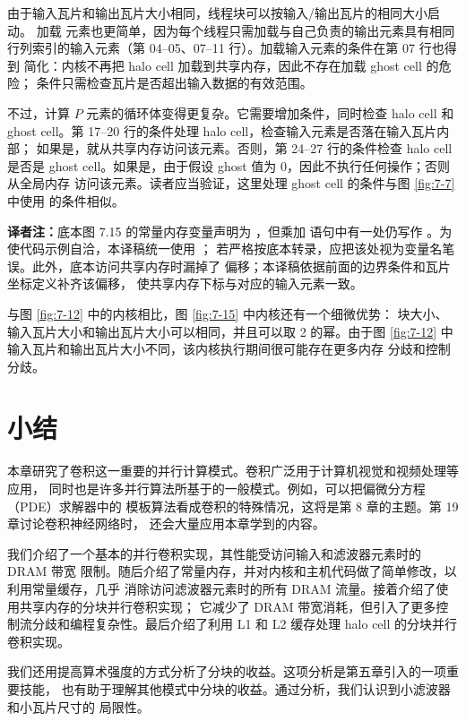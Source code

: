 由于输入瓦片和输出瓦片大小相同，线程块可以按输入/输出瓦片的相同大小启动。
加载  元素也更简单，因为每个线程只需加载与自己负责的输出元素具有相同
行列索引的输入元素（第 04–05、07–11 行）。加载输入元素的条件在第 07 行也得到
简化：内核不再把 halo cell 加载到共享内存，因此不存在加载 ghost cell 的危险；
条件只需检查瓦片是否超出输入数据的有效范围。

不过，计算 $P$ 元素的循环体变得更复杂。它需要增加条件，同时检查 halo cell 和
ghost cell。第 17–20 行的条件处理 halo cell，检查输入元素是否落在输入瓦片内部；
如果是，就从共享内存访问该元素。否则，第 24–27 行的条件检查 halo cell 是否是
ghost cell。如果是，由于假设 ghost 值为 0，因此不执行任何操作；否则从全局内存
访问该元素。读者应当验证，这里处理 ghost cell 的条件与图 \ref{fig:7-7} 中使用
的条件相似。

\noindent\textbf{译者注：}底本图 7.15 的常量内存变量声明为 ，但乘加
语句中有一处仍写作 。为使代码示例自洽，本译稿统一使用 ；
若严格按底本转录，应把该处视为变量名笔误。此外，底本访问共享内存时漏掉了
 偏移；本译稿依据前面的边界条件和瓦片坐标定义补齐该偏移，
使共享内存下标与对应的输入元素一致。

与图 \ref{fig:7-12} 中的内核相比，图 \ref{fig:7-15} 中内核还有一个细微优势：
块大小、输入瓦片大小和输出瓦片大小可以相同，并且可以取 2 的幂。由于图
\ref{fig:7-12} 中输入瓦片和输出瓦片大小不同，该内核执行期间很可能存在更多内存
分歧和控制分歧。

\section{小结}
\label{sec:convolution-summary}

本章研究了卷积这一重要的并行计算模式。卷积广泛用于计算机视觉和视频处理等应用，
同时也是许多并行算法所基于的一般模式。例如，可以把偏微分方程（PDE）求解器中的
模板算法看成卷积的特殊情况，这将是第 8 章的主题。第 19 章讨论卷积神经网络时，
还会大量应用本章学到的内容。

我们介绍了一个基本的并行卷积实现，其性能受访问输入和滤波器元素时的 DRAM 带宽
限制。随后介绍了常量内存，并对内核和主机代码做了简单修改，以利用常量缓存，几乎
消除访问滤波器元素时的所有 DRAM 流量。接着介绍了使用共享内存的分块并行卷积实现；
它减少了 DRAM 带宽消耗，但引入了更多控制流分歧和编程复杂性。最后介绍了利用
L1 和 L2 缓存处理 halo cell 的分块并行卷积实现。

我们还用提高算术强度的方式分析了分块的收益。这项分析是第五章引入的一项重要技能，
也有助于理解其他模式中分块的收益。通过分析，我们认识到小滤波器和小瓦片尺寸的
局限性。

